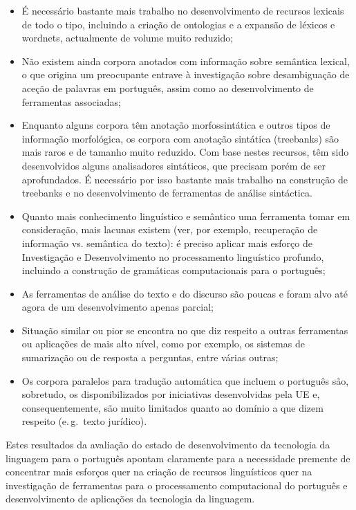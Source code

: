 \begin{multicols}{2}
\begin{itemize}
   \item É necessário bastante mais trabalho no desenvolvimento de recursos lexicais de todo o tipo, 
incluindo a criação de ontologias e a expansão de léxicos e wordnets, actualmente de volume muito reduzido;

   \item Não existem ainda corpora anotados com informação sobre semântica lexical, o que origina um preocupante 
entrave à investigação sobre desambiguação de aceção de palavras em português, assim como
ao desenvolvimento de ferramentas associadas; 

   \item Enquanto alguns corpora têm anotação morfossintática e outros tipos de informação morfológica, 
os corpora com anotação sintática (treebanks) são mais raros e de tamanho muito reduzido. 
Com base nestes recursos, têm sido desenvolvidos alguns analisadores sintáticos, que precisam 
porém de ser aprofundados. É necessário por isso bastante mais trabalho na construção de treebanks
e no desenvolvimento de ferramentas de análise sintáctica.

   \item Quanto mais conhecimento linguístico e semântico uma ferramenta tomar em consideração, 
mais lacunas existem (ver, por exemplo, recuperação de informação vs. semântica do texto):
 é preciso aplicar mais esforço de Investigação e Desenvolvimento no processamento
linguístico profundo, incluindo a construção de gramáticas computacionais para o português;

   \item As ferramentas de análise do texto e do discurso são poucas e foram alvo até agora de um desenvolvimento apenas parcial;

\item Situação similar ou pior se encontra no que diz respeito a outras
ferramentas ou aplicações de mais alto nível, como por exemplo, os sistemas de sumarização ou de resposta a perguntas, 
entre várias outras;

   \item Os corpora paralelos para tradução automática que incluem o português são, sobretudo, 
os disponibilizados por iniciativas desenvolvidas pela UE e, consequentemente, são muito limitados quanto ao domínio
a que dizem respeito (e.\,g.~texto jurídico).


\end{itemize}

Estes resultados da avaliação do estado de desenvolvimento da tecnologia da linguagem para o português
apontam claramente para a necessidade premente de concentrar mais esforços quer na criação de recursos 
linguísticos quer na investigação de ferramentas 
para o processamento computacional do português e desenvolvimento de aplicações da tecnologia da linguagem. 


\end{multicols}
